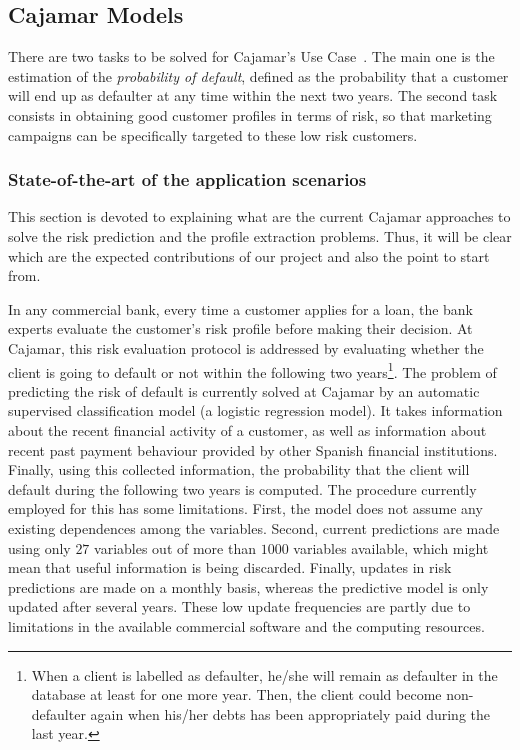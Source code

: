 
\newpage
\newpage
\newcommand{\X}{\mathbf{X}}
\newcommand{\Y}{\mathbf{Y}}
\newcommand{\Z}{\mathbf{Z}}
\newcommand{\x}{\mathbf{x}}
\newcommand{\y}{\mathbf{y}}
\newcommand{\z}{\mathbf{z}}
\newcommand{\argmax}[1]{\underset{#1}{\operatorname{arg}\,\operatorname{max}}\;}


\subsection{Cajamar Models}
\label{Section:CajaMarModels}

There are two tasks to be solved for Cajamar's Use Case~\cite{Fer14b}. The main one is the estimation of the \emph{probability of default}, defined as the probability that a customer will end up as defaulter at any time within the next two years. The second task consists in obtaining good customer profiles in terms of risk, so that marketing campaigns can be specifically targeted to these low risk customers. 

\subsubsection{State-of-the-art of the application scenarios} \label{SubSection:}

This section is devoted to explaining what are the current Cajamar approaches to solve the risk prediction and the profile extraction problems. Thus, it will be clear which are the expected contributions of our project and also the point to start from.

In any commercial bank, every time a customer applies for a loan, the bank experts evaluate the customer's risk profile before making their decision. At Cajamar, this risk evaluation protocol is addressed by evaluating whether the client is going to default or not within the following two years\footnote{When a client is labelled as defaulter, he/she will remain as defaulter in the database at least for one more year. Then, the client could become non-defaulter again when his/her debts has been appropriately paid during the last year.}. The problem of predicting the risk of default is currently solved at Cajamar by an automatic supervised classification model (a logistic regression model). It takes information about the recent financial activity of a customer, as well as information about recent past payment behaviour provided by other Spanish financial institutions. Finally, using this collected information, the probability that the client will default during the following two years is computed. The procedure currently employed for this has some limitations. First, the model does not assume any existing dependences among the variables. Second, current predictions are made using only $27$ variables out of more than $1000$ variables available, which might mean that useful information is being discarded. Finally, updates in risk predictions are made on a monthly basis, whereas the predictive model is only updated after several years. These low update frequencies are partly due to limitations in the available commercial software and the computing resources.

